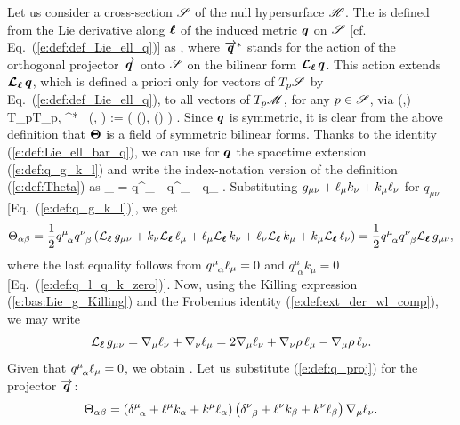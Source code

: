 Let us consider a cross-section $\mathscr{S}$ of the null hypersurface $\mathscr{H}$.
The
is defined from the Lie derivative along $\bm{\ell}$ of the induced metric $\bm{q}$ on $\mathscr{S}$
[cf. Eq.~(\ref{e:def:def_Lie_ell_q})] as
\be \label{e:def:Theta}
   ,
\ee
where $\overrightarrow{\bm{q}}^*$ stands for the action of the orthogonal projector $\overrightarrow{\bm{q}}$
onto $\mathscr{S}$ on the bilinear form $\bm{\mathcal{L}}_{\bm{\ell}}\, \bm{q}$.
This action extends $\bm{\mathcal{L}}_{\bm{\ell}}\, \bm{q}$, which is defined a priori only
for vectors of $T_p\mathscr{S}$ by Eq.~(\ref{e:def:def_Lie_ell_q}),
to all vectors of $T_p\mathscr{M}$, for any $p\in\mathscr{S}$, via
\be
    \forall (,) \in T_p\M \times T_p\M, \quad
         ^* \Lie{\el} \,  (, ) :=
         \Lie{\el}  \left( (), () \right) .
\ee
Since $\bm{q}$ is symmetric, it is clear from the above definition that
$\bm{\Theta}$ is a field of symmetric bilinear forms.
Thanks to the identity (\ref{e:def:Lie_ell_bar_q}), we can use for $\bm{q}$
the spacetime extension (\ref{e:def:q_g_k_l})
and write the index-notation version of the definition (\ref{e:def:Theta}) as
\be \label{e:def:Theta_index}
    \Theta_{\alpha\beta} =  q^\mu_{\ \, \alpha} q^\nu_{\ \, \beta}
            \Liec{\el} q_{\mu\nu} .
\ee
Substituting $g_{\mu\nu} + \ell_\mu k_\nu + k_\mu \ell_\nu$ for $q_{\mu\nu}$
[Eq.~(\ref{e:def:q_g_k_l})], we get
\[
    \Theta_{\alpha\beta} = \frac{1}{2} q^\mu_{\ \, \alpha} q^\nu_{\ \, \beta}
    \left( {\mathcal{L}}_{\bm{\ell}}\, g_{\mu\nu} + k_\nu {\mathcal{L}}_{\bm{\ell}}\, \ell_\mu + \ell_\mu {\mathcal{L}}_{\bm{\ell}}\, k_\nu
    + \ell_\nu {\mathcal{L}}_{\bm{\ell}}\, k_\mu + k_\mu {\mathcal{L}}_{\bm{\ell}}\, \ell_\nu \right)
    = \frac{1}{2} q^\mu_{\ \, \alpha} q^\nu_{\ \, \beta} {\mathcal{L}}_{\bm{\ell}}\, g_{\mu\nu} ,
\]
where the last equality follows from $q^\mu_{\ \, \alpha} \ell_\mu = 0$
and $q^\mu_{\ \, \alpha} k_\mu = 0$ [Eq.~(\ref{e:def:q_l_q_k_zero})].
Now, using the Killing expression (\ref{e:bas:Lie_g_Killing})
and the Frobenius identity (\ref{e:def:ext_der_wl_comp}), we may write
\[
    {\mathcal{L}}_{\bm{\ell}}\, g_{\mu\nu} = \nabla_\mu \ell_\nu + \nabla_\nu \ell_\mu
        = 2 \nabla_\mu \ell_\nu + \nabla_\nu \rho \, \ell_\mu - \nabla_\mu \rho \, \ell_\nu .
\]
Given that $q^\mu_{\ \, \alpha}  \ell_\mu = 0$, we obtain
\be \label{e:def:Theta_q_nabla_l}
    .
\ee
Let us substitute (\ref{e:def:q_proj}) for the projector $\overrightarrow{\bm{q}}$:
\[
    \Theta_{\alpha\beta}  = \left(\delta^\mu_{\ \, \alpha}
        + \ell^\mu k_\alpha + k^\mu \ell_\alpha \right)
        \left(\delta^\nu_{\ \, \beta}
        + \ell^\nu k_\beta + k^\nu \ell_\beta \right) \nabla_\mu \ell_\nu .
\]
